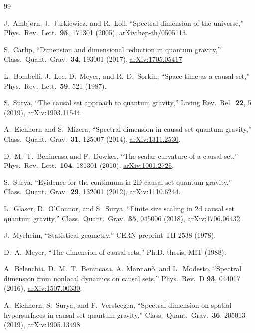 \documentclass[aps,prd,twocolumn,superscriptaddress,nofootinbib]{revtex4-2}
\begin{document}
\begin{thebibliography}{99}

J.~Ambj\o{}rn, J.~Jurkiewicz, and R.~Loll,
``Spectral dimension of the universe,''
Phys.\ Rev.\ Lett.\ \textbf{95}, 171301 (2005),
\href{https://arxiv.org/abs/hep-th/0505113}{arXiv:hep-th/0505113}.

S.~Carlip,
``Dimension and dimensional reduction in quantum gravity,''
Class.\ Quant.\ Grav.\ \textbf{34}, 193001 (2017),
\href{https://arxiv.org/abs/1705.05417}{arXiv:1705.05417}.

L.~Bombelli, J.~Lee, D.~Meyer, and R.~D.~Sorkin,
``Space-time as a causal set,''
Phys.\ Rev.\ Lett.\ \textbf{59}, 521 (1987).

S.~Surya,
``The causal set approach to quantum gravity,''
Living Rev.\ Rel.\ \textbf{22}, 5 (2019),
\href{https://arxiv.org/abs/1903.11544}{arXiv:1903.11544}.

A.~Eichhorn and S.~Mizera,
``Spectral dimension in causal set quantum gravity,''
Class.\ Quant.\ Grav.\ \textbf{31}, 125007 (2014),
\href{https://arxiv.org/abs/1311.2530}{arXiv:1311.2530}.

D.~M.~T.~Benincasa and F.~Dowker,
``The scalar curvature of a causal set,''
Phys.\ Rev.\ Lett.\ \textbf{104}, 181301 (2010),
\href{https://arxiv.org/abs/1001.2725}{arXiv:1001.2725}.

S.~Surya,
``Evidence for the continuum in 2D causal set quantum gravity,''
Class.\ Quant.\ Grav.\ \textbf{29}, 132001 (2012),
\href{https://arxiv.org/abs/1110.6244}{arXiv:1110.6244}.

L.~Glaser, D.~O'Connor, and S.~Surya,
``Finite size scaling in 2d causal set quantum gravity,''
Class.\ Quant.\ Grav.\ \textbf{35}, 045006 (2018),
\href{https://arxiv.org/abs/1706.06432}{arXiv:1706.06432}.

J.~Myrheim,
``Statistical geometry,''
CERN preprint TH-2538 (1978).

D.~A.~Meyer,
``The dimension of causal sets,''
Ph.D. thesis, MIT (1988).

A.~Belenchia, D.~M.~T.~Benincasa, A.~Marcian\`o, and L.~Modesto,
``Spectral dimension from nonlocal dynamics on causal sets,''
Phys.\ Rev.\ D \textbf{93}, 044017 (2016),
\href{https://arxiv.org/abs/1507.00330}{arXiv:1507.00330}.

A.~Eichhorn, S.~Surya, and F.~Versteegen,
``Spectral dimension on spatial hypersurfaces in causal set quantum gravity,''
Class.\ Quant.\ Grav.\ \textbf{36}, 205013 (2019),
\href{https://arxiv.org/abs/1905.13498}{arXiv:1905.13498}.

\end{thebibliography}
\end{document}
